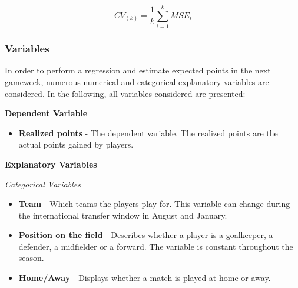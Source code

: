 \begin{equation}\label{eq:cv}
    CV_{(k)} = \frac{1}{k}\sum_{i=1}^{k} MSE_i
\end{equation}

\subsubsection{Variables}
In order to perform a regression and estimate expected points in the next gameweek, numerous numerical and categorical explanatory variables are considered. In the following, all variables considered are presented: 

\newpar

\textbf{Dependent Variable}
\begin{itemize}
    \item \textbf{Realized points} - The dependent variable. The realized points are the actual points gained by players.
\end{itemize}

\textbf{Explanatory Variables}

\textit{Categorical Variables}
\newpar
\begin{itemize}
    \item \textbf{Team} - Which teams the players play for. This variable can change during the international transfer window in August and January.  
    
    \item \textbf{Position on the field} - Describes whether a player is a goalkeeper, a defender, a midfielder or a forward. The variable is constant throughout the season.
    \item \textbf{Home/Away} - Displays whether a match is played at home or away.
\end{itemize}
\newpar


